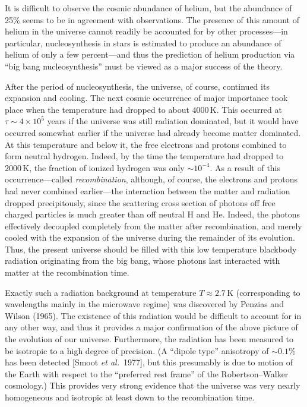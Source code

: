 It is difficult to observe the cosmic abundance of helium, but the abundance of 25\%
seems to be in agreement with observations. The presence of this amount of helium in
the universe cannot readily be accounted for by other processes---in particular,
nucleosynthesis in stars is estimated to produce an abundance of helium of only a few
percent---and thus the prediction of helium production via ``big bang nucleosynthesis''
must be viewed as a major success of the theory.

After the period of nucleosynthesis, the universe, of course, continued its expansion
and cooling. The next cosmic occurrence of major importance took place when the
temperature had dropped to about \(4000\,\mathrm{K}\). This occurred at
\(\tau\sim4\times10^5\) years if the universe was still radiation dominated, but it
would have occurred somewhat earlier if the universe had already become matter
dominated. At this temperature and below it, the free electrons and protons combined
to form neutral hydrogen. Indeed, by the time the temperature had dropped to
\(2000\,\mathrm{K}\), the fraction of ionized hydrogen was only \(\sim10^{-4}\). As a
result of this occurrence---called \emph{recombination}, although, of course, the
electrons and protons had never combined earlier---the interaction between the matter
and radiation dropped precipitously, since the scattering cross section of photons off
free charged particles is much greater than off neutral \(\mathrm{H}\) and \(\mathrm{He}\).
Indeed, the photons effectively decoupled completely from the matter after
recombination, and merely cooled with the expansion of the universe during the
remainder of its evolution. Thus, the present universe should be filled with this low
temperature blackbody radiation originating from the big bang, whose photons last
interacted with matter at the recombination time.

Exactly such a radiation background at temperature \(T\approx2.7\,\mathrm{K}\)
(corresponding to wavelengths mainly in the microwave regime) was discovered by
Penzias and Wilson (1965). The existence of this radiation would be difficult to
account for in any other way, and thus it provides a major confirmation of the above
picture of the evolution of our universe. Furthermore, the radiation has been measured
to be isotropic to a high degree of precision. (A ``dipole type'' anisotropy of
\(\sim0.1\%\) has been detected [Smoot \emph{et al.}\ 1977], but this presumably is
due to motion of the Earth with respect to the ``preferred rest frame'' of the
Robertson--Walker cosmology.) This provides very strong evidence that the universe
was very nearly homogeneous and isotropic at least down to the recombination time.

